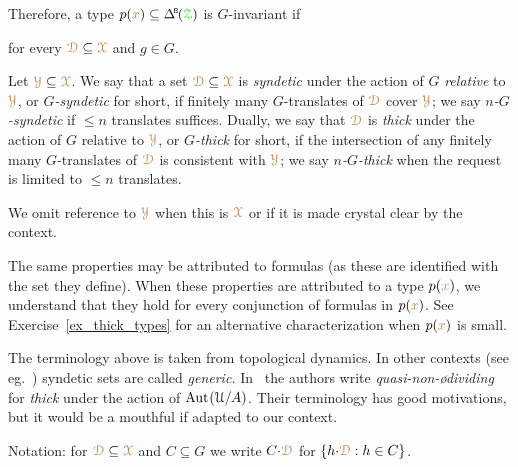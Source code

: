 
Therefore, a type $p({\mr x})\subseteq\BDelta(\grZ)$ is $G$-invariant if

\hfill for every ${\color{brown}\EuScript D}\subseteq{\color{brown}\EuScript X}$ and $g\in G$.


Let ${\color{brown}\EuScript Y}\subseteq{\color{brown}\EuScript X}$.
We say that a set ${\color{brown}\EuScript D}\subseteq{\color{brown}\EuScript X}$ is \emph{syndetic\/} under the action of $G$ \emph{relative\/} to ${\color{brown}\EuScript Y}$, or \emph{$G$-syndetic\/} for short, if finitely many $G$-translates of ${\color{brown}\EuScript D}$ cover ${\color{brown}\EuScript Y}$; we say \emph{$n$-$G$-syndetic\/} if $\le n$ translates suffices.
Dually, we say that ${\color{brown}\EuScript D}$ is \emph{thick\/} under the action of $G$ relative to ${\color{brown}\EuScript Y}$, or \emph{$G$-thick\/} for short, if the intersection of any finitely many $G$-translates of ${\color{brown}\EuScript D}$ is consistent with ${\color{brown}\EuScript Y}$; we say \emph{$n$-$G$-thick\/} when the request is limited to $\le n$ translates.

We omit reference to ${\color{brown}\EuScript Y}$ when this is ${\color{brown}\EuScript X}$ or if it is made crystal clear by the context.

The same properties may be attributed to formulas (as these are identified with the set they define).
When these properties are attributed to a type $p({\color{brown} x})$, we understand that they hold for every conjunction of formulas in $p({\color{brown} x})$.
See Exercise~\ref{ex_thick_types} for an alternative characterization when $p({\color{brown} x})$ is small.

\noindent\llap{\textcolor{red}{\Large\warning}\kern1.5ex}\ignorespaces
The terminology above is taken from topological dynamics.
In other contexts (see eg.~\cite{Newelski09}) syndetic sets are called \textit{generic.}
In~\cite{CK} the authors write \textit{quasi-non-ødividing\/} for \textit{thick\/} under the action of ${\rm Aut\kern.15ex}(\EuScript U/A)$.
Their terminology has good motivations, but it would be a mouthful if adapted to our context.

Notation: for ${\color{brown}\EuScript D}\subseteq{\color{brown}\EuScript X}$ and $C\subseteq G$ we write \emph{$C{\cdot}{\color{brown}\EuScript D}$\/} for $\{h{\cdot}{\color{brown}\EuScript D}: h\in C\}$.

